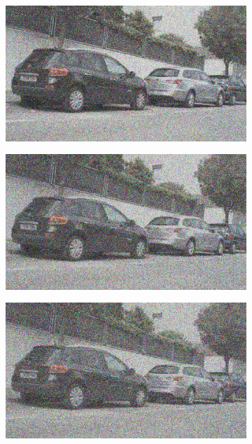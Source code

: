 \documentclass[a4paper]{ctexart}
\begin{document}
\begin{figure}[htbp]
\begin{subfigure}{0.08\textwidth}
			\label{fig：Gamma=0.9, Gauss Noise = 0.4}
		\end{subfigure}
		\begin{subfigure}{0.08\textwidth}
			\captionsetup{font=scriptsize}
			\includegraphics[width=\linewidth]{picture/Edge Detection/degrade/RGB_001 Gamma=0.9, Gauss Noise=0.5}
			\label{fig：Gamma=0.9, Gauss Noise = 0.5}
		\end{subfigure}
		\begin{subfigure}{0.08\textwidth}
			\captionsetup{font=scriptsize}
			\includegraphics[width=\linewidth]{picture/Edge Detection/degrade/RGB_001 Gamma=0.9, Gauss Noise=0.6}
			\label{fig：Gamma=0.9, Gauss Noise = 0.6}
		\end{subfigure}
		\begin{subfigure}{0.08\textwidth}
			\captionsetup{font=scriptsize}
			\includegraphics[width=\linewidth]{picture/Edge Detection/degrade/RGB_001 Gamma=0.9, Gauss Noise=0.7}

\end{subfigure}
\end{figure}
\end{document}

